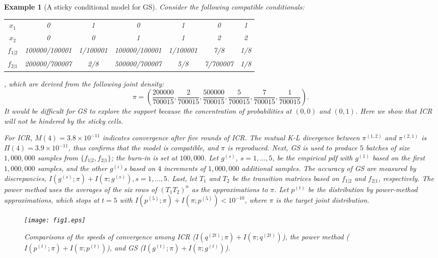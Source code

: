 \documentclass[12pt,a4paper]{article}
\newtheorem{example}{Example}
\begin{document}
\begin{example} [A sticky conditional model for GS]\rm
Consider the following compatible conditionals:
\begin{center}
\begin{tabular}{ccccccc}
\toprule
$x_1$&0&1&0&1&0&1\\
$x_2$&0&0&1&1&2&2\\
\midrule
$f_{1|2}$&100000/100001&1/100001&100000/100001&1/100001&7/8&1/8\\
$f_{2|1}$&200000/700007&2/8&500000/700007&5/8&7/700007&1/8\\
\bottomrule
\end{tabular}
\end{center}
, which are derived from the following joint density:
\[\pi=\left(\frac {200000}{700015},\frac {2}{700015},\frac {500000}{700015},\frac {5}{700015},
\frac {7}{700015},\frac {1}{700015}\right).\]
It would be difficult for GS to explore the support because the concentration of probabilities at $(0,0)$  and $(0,1)$. Here we show that ICR will not be hindered by the sticky cells.

For ICR, %
 $M(4)=3.8\times 10^{-11}$ indicates convergence after five rounds of ICR.
The mutual K-L divergence between $\pi^{(1,2)}$ and $\pi^{(2,1)}$ is $\Pi(4)=3.9\times 10^{-11}$, thus confirms that the model is compatible, and $\pi$ is reproduced.
Next, GS is used to produce $5$ batches of size $1,000,000$ samples from $\{f_{1|2},f_{2|1}\}$; the burn-in is set at $100,000$.
Let $g^{(s)}$, $s=1,\ldots,5$, be the empirical pdf with $g^{(1)}$ based on the first
$1,000,000$ samples, and the other $g^{(i)}$s based on $4$ increments of  $1,000,000$ additional samples.
The accuracy of GS  are measured by  discrepancies, $I(g^{(s)};\pi)+I(\pi;g^{(s)}), s=1,\ldots,5$.
Last, let $T_1$ and $T_2$ be the transition matrices based on $f_{1|2}$ and $f_{2|1}$, respectively.
The power method  uses the averages of the six rows of $(T_1T_2)^n$ as the approximations to $\pi$.
Let $p^{(t)}$ be the distribution by power-method approximations, which stops at $t=5$ with  $I(p^{(5)};\pi)+I(\pi;p^{(5)})<10^{-10}$, where $\pi$ is the target joint distribution.

\begin{figure}
\begin{center}
\texttt{[image: fig1.eps]}
\end{center}
\vspace{-0.8cm}
\caption{\small Comparisons of the speeds of convergence among ICR ($I(q^{(2t)};\pi)+I(\pi;q^{(2t)})$), the power method ($I(p^{(t)};\pi)+I(\pi;p^{(t)})$), and GS ($I(g^{(t)};\pi)+I(\pi;g^{(t)})$).\label{fig:1}}
\end{figure}


\end{example}
\end{document}
